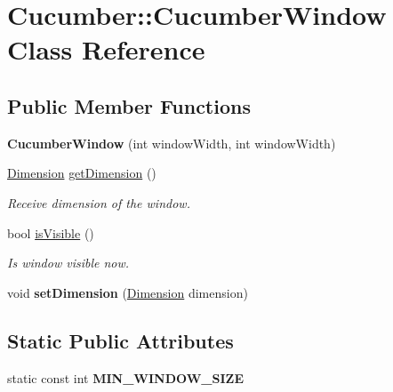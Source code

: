 \hypertarget{classCucumber_1_1CucumberWindow}{}\section{Cucumber\+:\+:Cucumber\+Window Class Reference}
\label{classCucumber_1_1CucumberWindow}
\subsection*{Public Member Functions}
\begin{DoxyCompactItemize}
\item 
\hypertarget{classCucumber_1_1CucumberWindow_a890cc2b621ea74f80279981d31dcb88c}{}\label{classCucumber_1_1CucumberWindow_a890cc2b621ea74f80279981d31dcb88c} 
{\bfseries Cucumber\+Window} (int window\+Width, int window\+Width)
\item 
\hyperlink{classCucumber_1_1Dimension}{Dimension} \hyperlink{classCucumber_1_1CucumberWindow_a06ae08d3cfe34d59b5b50f9271fb2404}{get\+Dimension} ()
\begin{DoxyCompactList}\small\item\em Receive dimension of the window. \end{DoxyCompactList}\item 
\hypertarget{classCucumber_1_1CucumberWindow_a987df02c825bc2d18d5776dee81b3504}{}\label{classCucumber_1_1CucumberWindow_a987df02c825bc2d18d5776dee81b3504} 
bool \hyperlink{classCucumber_1_1CucumberWindow_a987df02c825bc2d18d5776dee81b3504}{is\+Visible} ()
\begin{DoxyCompactList}\small\item\em Is window visible now. \end{DoxyCompactList}\item 
\hypertarget{classCucumber_1_1CucumberWindow_abea00ec084a4240326af8739e00744d2}{}\label{classCucumber_1_1CucumberWindow_abea00ec084a4240326af8739e00744d2} 
void {\bfseries set\+Dimension} (\hyperlink{classCucumber_1_1Dimension}{Dimension} dimension)
\end{DoxyCompactItemize}
\subsection*{Static Public Attributes}
\begin{DoxyCompactItemize}
\item 
\hypertarget{classCucumber_1_1CucumberWindow_acff22ef34d097e1c1c315a91f37c82b7}{}\label{classCucumber_1_1CucumberWindow_acff22ef34d097e1c1c315a91f37c82b7} 
static const int {\bfseries M\+I\+N\+\_\+\+W\+I\+N\+D\+O\+W\+\_\+\+S\+I\+ZE}
\end{DoxyCompactItemize}


